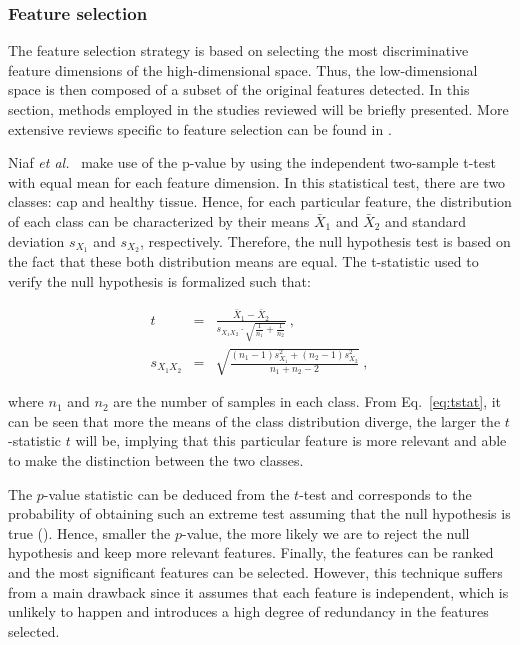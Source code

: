 \subsubsection{Feature selection}\label{subsubsec:chp3:img-clas:CADX:fea-ext:sel}
The feature selection strategy is based on selecting the most discriminative feature dimensions of the high-dimensional space.
Thus, the low-dimensional space is then composed of a subset of the original features detected.
In this section, methods employed in the studies reviewed will be briefly presented.
More extensive reviews specific to feature selection can be found in \cite{Saeys2007}.

Niaf \textit{et al.}~\cite{Niaf2011,Niaf2012} make use of the p-value by using the independent two-sample t-test with equal mean for each feature dimension.
In this statistical test, there are two classes: \ac{cap} and healthy tissue.
Hence, for each particular feature, the distribution of each class can be characterized by their means $\bar{X}_1$ and $\bar{X}_2$ and standard deviation $s_{X_1}$ and $s_{X_2}$, respectively.
Therefore, the null hypothesis test is based on the fact that these both distribution means are equal.
The t-statistic used to verify the null hypothesis is formalized such that:

\begin{eqnarray}
t & = & \frac{\bar {X}_1 - \bar{X}_2}{s_{X_1X_2} \cdot \sqrt{\frac{1}{n_1}+\frac{1}{n_2}}} \ , \label{eq:tstat} \\
s_{X_1X_2} & = & \sqrt{\frac{(n_1-1)s_{X_1}^2+(n_2-1)s_{X_2}^2}{n_1+n_2-2}} \ , \nonumber
\end{eqnarray}

\noindent where $n_1$ and $n_2$ are the number of samples in each class.
From Eq.~\eqref{eq:tstat}, it can be seen that more the means of the class distribution diverge, the larger the $t$-statistic $t$ will be, implying that this particular feature is more relevant and able to make the distinction between the two classes. 

The $p$-value statistic can be deduced from the $t$-test and corresponds to the probability of obtaining such an extreme test assuming that the null hypothesis is true (\cite{Goodman1999}).
Hence, smaller the $p$-value, the more likely we are to reject the null hypothesis and keep more relevant features.
Finally, the features can be ranked and the most significant features can be selected.
However, this technique suffers from a main drawback since it assumes that each feature is independent, which is unlikely to happen and introduces a high degree of redundancy in the features selected.

